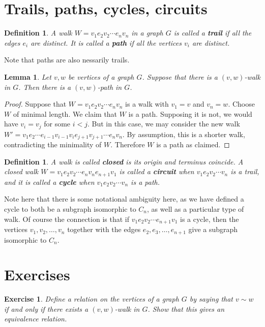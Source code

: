 \documentclass[12pt]{report}
\theoremstyle{plain}
\newtheorem{defn}[thm]{Definition}
\newtheorem{lem}[thm]{Lemma}
\newtheorem{exercise}{Exercise}[section]
\newcommand{\Xb}[1]{\textbf{#1}\index{#1}}
\begin{document}
\section{Trails, paths, cycles, circuits}

\begin{defn}
A walk $W = v_1 e_2 v_2 \cdots e_n v_n$ in a graph $G$ is called a
\Xb{trail} if all the edges $e_i$ are distinct. It is called a \Xb{path} if
all the vertices $v_i$ are distinct.
\end{defn}
Note that paths are also nessarily trails.

\begin{lem}
Let $v, w$ be vertices of a graph $G$. Suppose that there is a $(v,w)$-walk
in $G$. Then there is a $(v,w)$-path in $G$.
\end{lem}
\begin{proof}
Suppose that $W = v_1 e_2 v_2 \cdots e_n v_n$ is a walk with $v_1 = v$ and
$v_n = w$. Choose $W$ of minimal length. We claim that $W$ is a path.
Supposing it is not, we would have $v_i = v_j$ for some $i < j$. But in
this case, we may consider the new walk $W' = v_1 e_2 \cdots e_{i-1}
v_{i-1} v_i e_{j+1} v_{j+1} \cdots e_n v_n$. By assumption, this is a
shorter walk, contradicting the minimality of $W$. Therefore $W$ is a path
as claimed.
\end{proof}

\begin{defn}
A walk is called \textbf{closed} is its origin and
terminus coincide. A closed walk $W = v_1 e_2 v_2 \cdots e_n v_n e_{n+1}
v_1$ is called a \Xb{circuit} when $v_1 e_2 v_2 \cdots v_n$ is a trail,
and it is called a \Xb{cycle} when $v_1 e_2 v_2 \cdots v_n$ is a path.
\end{defn}

Note here that there is some notational ambiguity here, as we have defined
a cycle to both be a subgraph isomorphic to $C_n$, as well as a particular
type of walk. Of course the connection is that if $v_1 e_2 v_2 \cdots
e_{n+1} v_1$ is a cycle, then the vertices $v_1, v_2, \ldots, v_n$
together with the edges $e_2, e_3, \ldots, e_{n+1}$ give a subgraph isomorphic
to $C_n$.

\section{Exercises}

\begin{exercise} \label{walk equivalence}
Define a relation on the vertices of a graph $G$ by saying that $v \sim w$
if and only if there exists a $(v, w)$-walk in $G$. Show that this gives an
equivalence relation.
\end{exercise}
\end{document}
